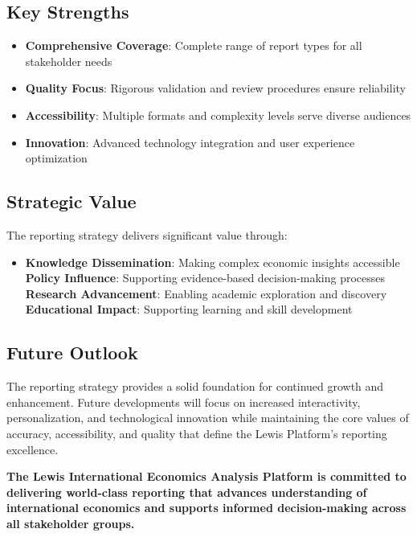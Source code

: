 \documentclass[11pt,a4paper]{article}
\begin{document}
\subsection{Key Strengths}
\begin{itemize}
    \item \textbf{Comprehensive Coverage}: Complete range of report types for all stakeholder needs
    \item \textbf{Quality Focus}: Rigorous validation and review procedures ensure reliability
    \item \textbf{Accessibility}: Multiple formats and complexity levels serve diverse audiences
    \item \textbf{Innovation}: Advanced technology integration and user experience optimization
\end{itemize}

\subsection{Strategic Value}
The reporting strategy delivers significant value through:

\begin{itemize}
    \item \textbf{Knowledge Dissemination}: Making complex economic insights accessible
    \textbf{Policy Influence}: Supporting evidence-based decision-making processes
    \textbf{Research Advancement}: Enabling academic exploration and discovery
    \textbf{Educational Impact}: Supporting learning and skill development
\end{itemize}

\subsection{Future Outlook}
The reporting strategy provides a solid foundation for continued growth and enhancement. Future developments will focus on increased interactivity, personalization, and technological innovation while maintaining the core values of accuracy, accessibility, and quality that define the Lewis Platform's reporting excellence.

\begin{center}
\textbf{\large The Lewis International Economics Analysis Platform is committed to delivering world-class reporting that advances understanding of international economics and supports informed decision-making across all stakeholder groups.}
\end{center}
\end{document}
